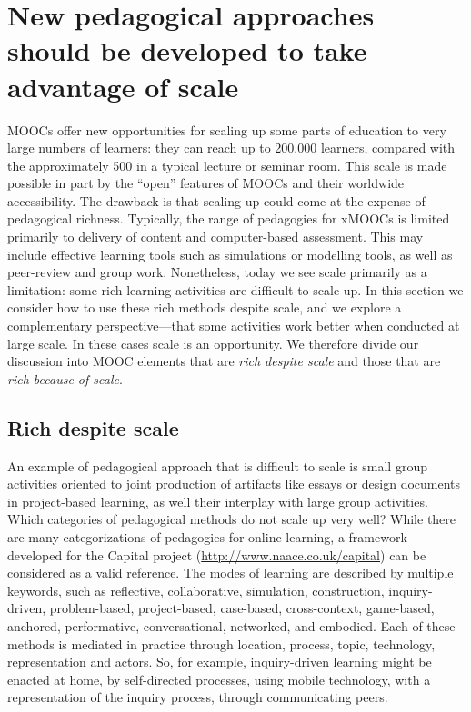 \section{New pedagogical approaches should be developed to take advantage of scale}



MOOCs offer new opportunities for scaling up some parts of education to very large
numbers of learners:
they can reach up to 200.000 learners, compared with the approximately
500 in a typical lecture or seminar room.
This scale is made possible
in part by the ``open'' features of MOOCs and their worldwide
accessibility.
The drawback is that scaling up could come at the
expense of pedagogical richness. Typically, the range of pedagogies for
xMOOCs is limited primarily to delivery of content and computer-based
assessment. This may include effective learning tools such as
simulations or modelling tools, as well as peer-review and group
work. Nonetheless, today we see scale primarily as a limitation: some
rich learning 
activities are difficult to scale up. In this section we consider
how to use these rich methods despite scale, and we explore a
complementary perspective---that some activities work better when conducted at
large scale. In these cases scale is an opportunity.  We therefore
divide our discussion into MOOC elements that are \emph{rich despite
  scale} and those that are \emph{rich because of scale}.

\subsection{Rich despite scale}

An example of pedagogical approach that is difficult to scale is small
group activities oriented to joint production of artifacts like essays
or design documents in project-based learning, as well their interplay
with large group activities. Which categories of pedagogical methods do
not scale up very well? While there are many categorizations of
pedagogies for online learning, a framework developed for the Capital
project (\url{http://www.naace.co.uk/capital}) can be considered as a valid reference. The modes of learning
are described by multiple keywords, such as reflective, collaborative,
simulation, construction, inquiry-driven, problem-based, project-based,
case-based, cross-context, game-based, anchored, performative,
conversational, networked, and embodied. Each of these methods is
mediated in practice through location, process, topic, technology,
representation and actors. So, for example, inquiry-driven learning
might be enacted at home, by self-directed processes, using mobile technology,
with a representation of the
inquiry process, through communicating peers.

